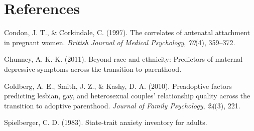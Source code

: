 \documentclass[man]{apa6}
\begin{document}
\newpage

\hypertarget{references}{%
\section{References}\label{references}}

\begingroup
\setlength{\parindent}{-0.5in}
\setlength{\leftskip}{0.5in}

\hypertarget{refs}{}
\leavevmode\hypertarget{ref-condon1997correlates}{}%
Condon, J. T., \& Corkindale, C. (1997). The correlates of antenatal attachment in pregnant women. \emph{British Journal of Medical Psychology}, \emph{70}(4), 359--372.

\leavevmode\hypertarget{ref-ghunney2011beyond}{}%
Ghunney, A. K.-K. (2011). Beyond race and ethnicity: Predictors of maternal depressive symptoms across the transition to parenthood.

\leavevmode\hypertarget{ref-goldberg2010preadoptive}{}%
Goldberg, A. E., Smith, J. Z., \& Kashy, D. A. (2010). Preadoptive factors predicting lesbian, gay, and heterosexual couples' relationship quality across the transition to adoptive parenthood. \emph{Journal of Family Psychology}, \emph{24}(3), 221.

\leavevmode\hypertarget{ref-spielberger1983state}{}%
Spielberger, C. D. (1983). State-trait anxiety inventory for adults.

\endgroup
\end{document}
